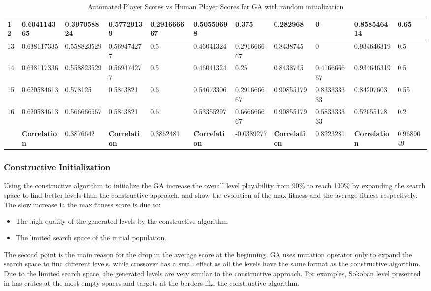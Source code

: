 \begin{landscape}
\begin{table}[!ht]
\begin{tabular}{|p{0.5in}|p{0.75in}|p{0.75in}|p{0.75in}|p{0.75in}|p{0.75in}|p{0.75in}|p{0.75in}|p{0.75in}|p{0.75in}|p{0.75in}|}
		\hline
		12 & 0.604114365 & 0.397058824 & 0.57729139 & 0.291666667 & 0.50550698 & 0.375 & 0.282968 & 0 & 0.858546414 & 0.65\\
		\hline
		13 & 0.638117335 & 0.558823529 & 0.569474277 & 0.5 & 0.46041324 & 0.291666667 & 0.8438745 & 0 & 0.934646319 & 0.5\\
		\hline
		14 & 0.638117336 & 0.558823529 & 0.569474277 & 0.5 & 0.46041324 & 0.25 & 0.8438745 & 0.416666667 & 0.934646319 & 0.5\\
		\hline
		15 & 0.620584613 & 0.578125 & 0.5843821 & 0.6 & 0.54673306 & 0.291666667 & 0.90855179 & 0.833333333 & 0.84207603 & 0.55\\
		\hline
		16 & 0.620584613 & 0.566666667 & 0.5843821 & 0.6 & 0.53355297 & 0.666666667 & 0.90855179 & 0.583333333 & 0.52655178 & 0.2\\
		\hline
		 & \textbf{Correlation} & 0.3876642 & \textbf{Correlation} & 0.3862481 & \textbf{Correlation} & -0.0389277 & \textbf{Correlation} & 0.8223281 & \textbf{Correlation} & 0.9689049\\
		\hline
	\end{tabular}
	\caption{Automated Player Scores vs Human Player Scores for GA with random initialization}
	\label{Table:randomScores}
\end{table}
\end{landscape}

\subsubsection{Constructive Initialization}
Using the constructive algorithm to initialize the GA increase the overall level playability from 90\% to reach 100\% by expanding the search space to find better levels than the constructive approach.  and  show the evolution of the max fitness and the average fitness respectively. The slow increase in the max fitness score is due to:
\begin{itemize} \itemsep0pt \parskip0pt 
	\item The high quality of the generated levels by the constructive algorithm.
	\item The limited search space of the initial population.
\end{itemize}
The second point is the main reason for the drop in the average score at the beginning. GA uses mutation operator only to expand the search space to find different levels, while crossover has a small effect as all the levels have the same format as the constructive algorithm. Due to the limited search space, the generated levels are very similar to the constructive approach. For examples, Sokoban level presented in  has crates at the most empty spaces and targets at the borders like the constructive algorithm.

